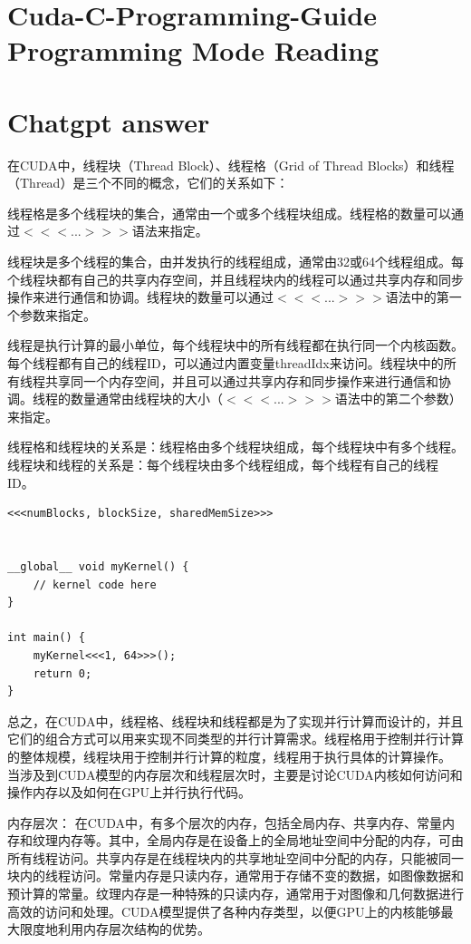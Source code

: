 \documentclass[11pt]{ctexart}
\begin{document}
	
\tableofcontents

\section{Cuda-C-Programming-Guide Programming Mode Reading}


\newpage
\section{Chatgpt answer}

在CUDA中，线程块（Thread Block）、线程格（Grid of Thread Blocks）和线程（Thread）是三个不同的概念，它们的关系如下：

线程格是多个线程块的集合，通常由一个或多个线程块组成。线程格的数量可以通过$<<<...>>>$语法来指定。

线程块是多个线程的集合，由并发执行的线程组成，通常由32或64个线程组成。每个线程块都有自己的共享内存空间，并且线程块内的线程可以通过共享内存和同步操作来进行通信和协调。线程块的数量可以通过$<<<...>>>$语法中的第一个参数来指定。

线程是执行计算的最小单位，每个线程块中的所有线程都在执行同一个内核函数。每个线程都有自己的线程ID，可以通过内置变量threadIdx来访问。线程块中的所有线程共享同一个内存空间，并且可以通过共享内存和同步操作来进行通信和协调。线程的数量通常由线程块的大小（$<<<...>>>$语法中的第二个参数）来指定。

线程格和线程块的关系是：线程格由多个线程块组成，每个线程块中有多个线程。线程块和线程的关系是：每个线程块由多个线程组成，每个线程有自己的线程ID。
\begin{lstlisting}
<<<numBlocks, blockSize, sharedMemSize>>>


__global__ void myKernel() {
    // kernel code here
}

int main() {
    myKernel<<<1, 64>>>();
    return 0;
}

\end{lstlisting}

总之，在CUDA中，线程格、线程块和线程都是为了实现并行计算而设计的，并且它们的组合方式可以用来实现不同类型的并行计算需求。线程格用于控制并行计算的整体规模，线程块用于控制并行计算的粒度，线程用于执行具体的计算操作。\\


当涉及到CUDA模型的内存层次和线程层次时，主要是讨论CUDA内核如何访问和操作内存以及如何在GPU上并行执行代码。

内存层次：
在CUDA中，有多个层次的内存，包括全局内存、共享内存、常量内存和纹理内存等。其中，全局内存是在设备上的全局地址空间中分配的内存，可由所有线程访问。共享内存是在线程块内的共享地址空间中分配的内存，只能被同一块内的线程访问。常量内存是只读内存，通常用于存储不变的数据，如图像数据和预计算的常量。纹理内存是一种特殊的只读内存，通常用于对图像和几何数据进行高效的访问和处理。CUDA模型提供了各种内存类型，以便GPU上的内核能够最大限度地利用内存层次结构的优势。
\end{document}
